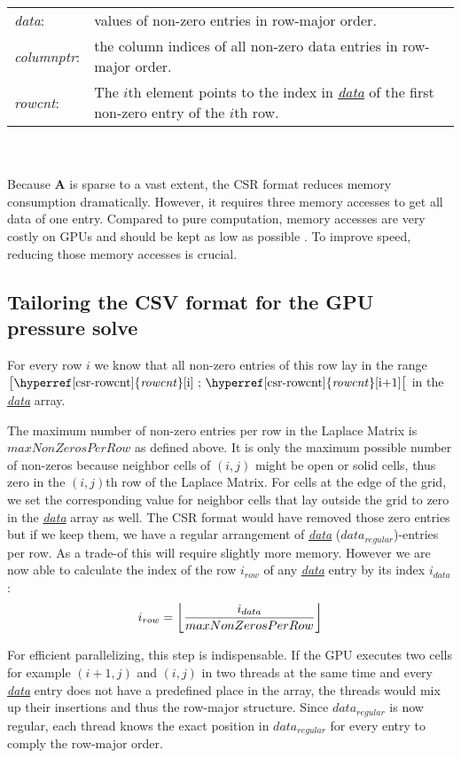 \begin{tabular}{ll}
	\textit{data\label{csr-data}}: & values of non-zero entries in row-major order.\\
	\textit{columnptr\label{csr-columnptr}}: & the column indices of all non-zero data entries in row-major order.\\
	\textit{rowcnt\label{csr-rowcnt}}: & The $i$th element points to the index in \hyperref[csr-data]{\textit{data}} of the first non-zero entry of the $i$th row.
\end{tabular}\\\\
Because \textbf{A} is sparse to a vast extent, the CSR format reduces memory consumption dramatically. However, it requires three memory accesses to get all data of one entry. Compared to pure computation, memory accesses are very costly on GPUs and should be kept as low as possible \parencite{fang2018benchmarking}\parencite{fujii2013data}. To improve speed, reducing those memory accesses is crucial.

\subsection{Tailoring the CSV format for the GPU pressure solve}\label{laplace-optimization}
For every row $i$ we know that all non-zero entries of this row lay in the range $\big[\text{\hyperref[csr-rowcnt]{\textit{rowcnt}}[i] ; \hyperref[csr-rowcnt]{\textit{rowcnt}}[i+1]}\big[$ in the \hyperref[csr-data]{\textit{data}} array. 
\par The maximum number of non-zero entries per row in the Laplace Matrix is $maxNonZerosPerRow$ as defined above. It is only the maximum possible number of non-zeros because neighbor cells of $(i,j)$ might be open or solid cells, thus zero in the $(i,j)$th row of the Laplace Matrix. For cells at the edge of the grid, we set the corresponding value for neighbor cells that lay outside the grid to zero in the \hyperref[csr-data]{\textit{data}} array as well. The CSR format would have removed those zero entries but if we keep them, we have a regular arrangement of \hyperref[csr-data]{\textit{data}} ($data_{regular}$)-entries per row. As a trade-of this will require slightly more memory. However we are now able to calculate the index of the row $i_{row}$ of any \hyperref[csr-data]{\textit{data}} entry by its index $i_{data}$:
\begin{equation} \label{row-index-by-data-index}
	i_{row} = \floor*{\frac{i_{data}}{maxNonZerosPerRow}}
\end{equation}
\par For efficient parallelizing, this step is indispensable. If the GPU executes two cells for example $(i+1,j)$ and $(i,j)$ in two threads at the same time and every \hyperref[csr-data]{\textit{data}} entry does not have a predefined place in the array, the threads would mix up their insertions and thus the row-major structure. Since $data_{regular}$ is now regular, each thread knows the exact position in $data_{regular}$ for every entry to comply the row-major order.
\newpage

